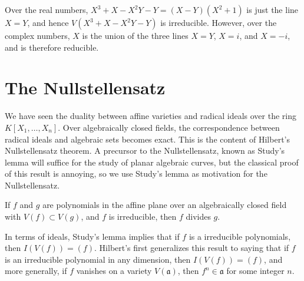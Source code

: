 \begin{example}
    Over the real numbers, $X^3 + X - X^2Y - Y = (X-Y)(X^2 + 1)$ is just the line $X = Y$, and hence $V(X^3 + X - X^2Y - Y)$ is irreducible. However, over the complex numbers, $X$ is the union of the three lines $X = Y$, $X = i$, and $X = -i$, and is therefore reducible.
\end{example}

\section{The Nullstellensatz}

We have seen the duality between affine varieties and radical ideals over the ring $K[X_1, \dots, X_n]$. Over algebraically closed fields, the correspondence between radical ideals and algebraic sets becomes exact. This is the content of Hilbert's Nullstellensatz theorem. A precursor to the Nullstellensatz, known as Study's lemma will suffice for the study of planar algebraic curves, but the classical proof of this result is annoying, so we use Study's lemma as motivation for the Nullstellensatz.

\begin{theorem}[Study]
    If $f$ and $g$ are polynomials in the affine plane over an algebraically closed field with $V(f) \subset V(g)$, and $f$ is irreducible, then $f$ divides $g$.
\end{theorem}

In terms of ideals, Study's lemma implies that if $f$ is a irreducible polynomials, then $I(V(f)) = (f)$. Hilbert's first generalizes this result to saying that if $f$ is an irreducible polynomial in any dimension, then $I(V(f)) = (f)$, and more generally, if $f$ vanishes on a variety $V(\mathfrak{a})$, then $f^n \in \mathfrak{a}$ for some integer $n$.

